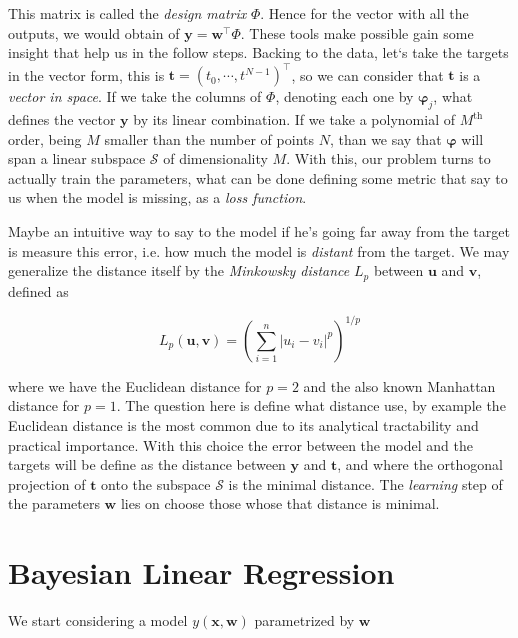\documentclass[11pt]{article} %
\begin{document}
This matrix is called the \textit{design matrix} $\Phi$. Hence for the vector with all the outputs, we would obtain of $\mathbf{y} = \mathbf{w}^\top \Phi$. These tools make possible gain some insight that help us in the follow steps. Backing to the data, let`s take the targets in the vector form, this is $\mathbf{t} = \left( t_0 , \cdots , t^{N-1} \right)^\top$, so we can consider that $\mathbf{t}$ is a \textit{vector in space}\cite{Bishop:2006:PRM:1162264}. If we take the columns of $\Phi$, denoting each one by $\boldsymbol{\varphi}_j$, what defines the vector $\mathbf{y}$ by its linear combination. If we take a polynomial of $M^\text{th}$ order, being $M$ smaller than the number of points $N$, than we say that $\boldsymbol{\varphi}$ will span a linear subspace $\mathcal{S}$ of dimensionality $M$. With this, our problem turns to actually train the parameters, what can be done defining some metric that say to us when the model is missing, as a \textit{loss function}.

Maybe an intuitive way to say to the model if he's going far away from the target is measure this error, i.e. how much the model is \textit{distant} from the target. We may generalize the distance itself by the \textit{Minkowsky distance} $L_p$ between $\mathbf{u}$ and $\mathbf{v}$, defined as

\begin{equation}
   L_p\left( \mathbf{u},\mathbf{v} \right)=\left(\sum_{i=1}^n |u_i-v_i|^p\right)^{1/p}
\end{equation}

where we have the Euclidean distance for $p=2$ and the also known Manhattan distance for $p=1$. The question here is define what distance use, by example the Euclidean distance is the most common due to its analytical tractability and practical importance. With this choice the error between the model and the targets will be define as the distance between $\mathbf{y}$ and $\mathbf{t}$, and where the orthogonal projection of $\mathbf{t}$ onto the subspace $\mathcal{S}$ is the minimal distance. The \textit{learning} step of the parameters $\mathbf{w}$ lies on choose those whose that distance is minimal.

\iffalse
\section{Bayesian Linear Regression}

We start considering a model $y\left( \mathbf{x},\mathbf{w} \right)$ parametrized by $\mathbf{w}$
\end{document}
